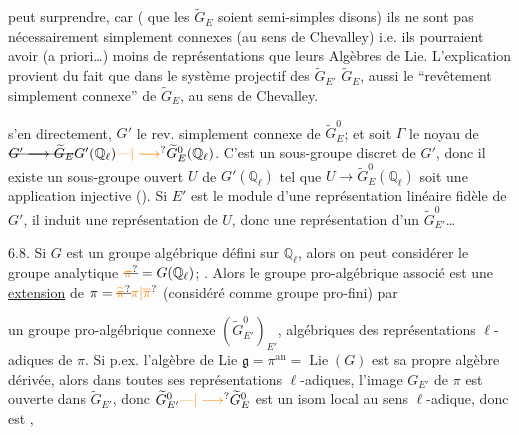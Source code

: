 peut surprendre, car ( que les $\widetilde G_E$ soient semi-simples disons)  ils ne sont pas nécessairement simplement connexes (au sens de Chevalley) i.e. ils pourraient avoir (a priori\ldots) moins de représentations que leurs Algèbres de Lie. L'explication provient du fait que dans le système projectif des $\widetilde G_{E'}$  $\widetilde G_E$,  aussi le ``revêtement simplement connexe'' de $\widetilde G_E$, au sens de Chevalley.

 s'en  directement,   $G'$ le rev. simplement connexe de $\widetilde G_E^0$; et soit $\Gamma$ le noyau de $\deleted{G'\longrightarrow\widetilde G_E}G'(\mathbb Q_\ell)\unsure{\text{---}|\longrightarrow}\widetilde G_E^0(\mathbb Q_\ell)$. C'est un sous-groupe discret de $G'$, donc il existe un sous-groupe ouvert $U$ de $G'(\mathbb Q_\ell)$ tel que $U\longrightarrow\widetilde G_E^0(\mathbb Q_\ell)$ soit une  application injective (). Si $E'$ est le module d'une représentation  linéaire fidèle de $G'$, il induit une représentation  de $U$, donc une représentation d'un $\widetilde G_{E'}^0$\ldots


6.8. Si $G$ est un groupe algébrique  défini sur $\mathbb Q_\ell$, alors on peut considérer le groupe analytique $\deleted{\unsure{\pi}}=G(\mathbb Q_\ell)$; . Alors  le groupe pro-algébrique  associé est une \uline{extension} de $\pi=\deleted{\unsure{\widetilde\pi}}\unsure{\pi|\overline\pi}$ (considéré comme groupe pro-fini) par

un  groupe pro-algébrique connexe $(\widetilde G_{E'}^0)_{E'}$,   algébriques des représentations  $\ell$-adiques de $\pi$. Si p.ex. l'algèbre de Lie $\mathfrak g=\pi^{\mathrm{an}}=\operatorname{Lie}(G)$ est sa propre algèbre dérivée, alors dans toutes ses représentations $\ell$-adiques, l'image $G_{E'}$ de $\pi$ est ouverte dans $\widetilde G_{E'}$, donc $\widetilde G_{E'}^0\unsure{\text{---}|\longrightarrow}\widetilde G_E^0$  est un isom local au sens $\ell$-adique, donc  est ,

